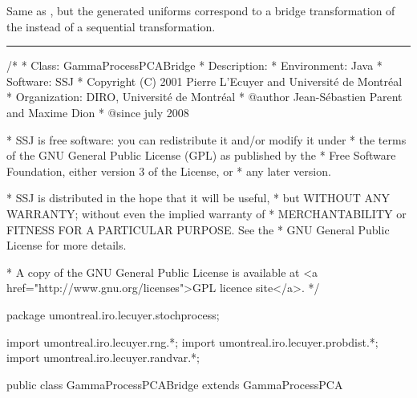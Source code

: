 
Same as , but the generated uniforms
correspond to a bridge transformation of the 
instead of a sequential transformation.

\bigskip\hrule\bigskip

\begin{code}
\begin{hide}
/*
 * Class:        GammaProcessPCABridge
 * Description:  
 * Environment:  Java
 * Software:     SSJ 
 * Copyright (C) 2001  Pierre L'Ecuyer and Université de Montréal
 * Organization: DIRO, Université de Montréal
 * @author       Jean-Sébastien Parent and Maxime Dion
 * @since        july 2008

 * SSJ is free software: you can redistribute it and/or modify it under
 * the terms of the GNU General Public License (GPL) as published by the
 * Free Software Foundation, either version 3 of the License, or
 * any later version.

 * SSJ is distributed in the hope that it will be useful,
 * but WITHOUT ANY WARRANTY; without even the implied warranty of
 * MERCHANTABILITY or FITNESS FOR A PARTICULAR PURPOSE.  See the
 * GNU General Public License for more details.

 * A copy of the GNU General Public License is available at
   <a href="http://www.gnu.org/licenses">GPL licence site</a>.
 */
\end{hide}
package umontreal.iro.lecuyer.stochprocess;\begin{hide}
import umontreal.iro.lecuyer.rng.*;
import umontreal.iro.lecuyer.probdist.*;
import umontreal.iro.lecuyer.randvar.*;

\end{hide}

public class GammaProcessPCABridge extends GammaProcessPCA \begin{hide} {
    protected BrownianMotionBridge BMBridge;
    protected double       mu2OverNu,
                           mu2dTOverNu;
    protected double[]     bMu2dtOverNuL,  // For precomputations for G Bridge
                           bMu2dtOverNuR;
    protected int[]        wIndexList;
\end{hide}
\end{code}
